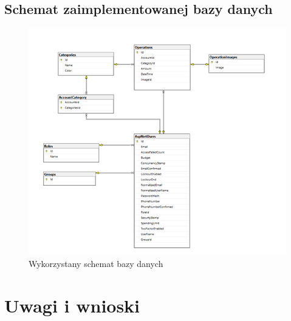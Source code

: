 \documentclass[12pt,a4paper,oneside]{article}
\begin{document}
\subsection{Schemat zaimplementowanej bazy danych}
\begin{figure}[H]
    \centering
    \includegraphics[width=\hsize,keepaspectratio]{images/DB2.png}
    \caption{Wykorzystany schemat bazy danych}
\end{figure}

\section{Uwagi i wnioski}
\end{document}
